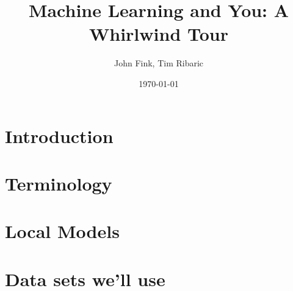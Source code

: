 \documentclass{beamer}
\title{Machine Learning and You: A Whirlwind Tour}
\author{John Fink, Tim Ribaric}
\date{\today}
\begin{document}
\frame{\titlepage}

\section[Outline]{}
\frame{\tableofcontents}

\section{Introduction}
\frame

\section{Terminology}
\frame

\section{Local Models}
\frame

\section{Data sets we'll use}
\frame

\frame

\end{document}
